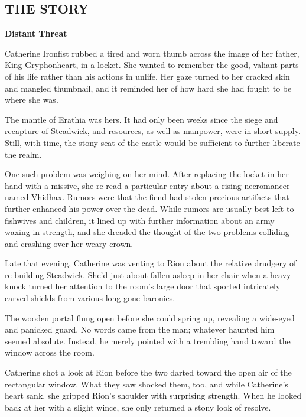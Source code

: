 \newpage

\begin{multicols*}{2}

\subsection*{\MakeUppercase{The story}}

\textbf{Distant Threat}

Catherine Ironfist rubbed a tired and worn thumb across the image of her father, King Gryphonheart, in a locket. She wanted to remember the good, valiant parts of his life rather than his actions in unlife. Her gaze turned to her cracked skin and mangled thumbnail, and it reminded her of how hard she had fought to be where she was. 

The mantle of Erathia was hers. It had only been weeks since the siege and recapture of Steadwick, and resources, as well as manpower, were in short supply. Still, with time, the stony seat of the castle would be sufficient to further liberate the realm.

One such problem was weighing on her mind. After replacing the locket in her hand with a missive, she re-read a particular entry about a rising necromancer named Vhidhax. Rumors were that the fiend had stolen precious artifacts that further enhanced his power over the dead. While rumors are usually best left to fishwives and children, it lined up with further information about an army waxing in strength, and she dreaded the thought of the two problems colliding and crashing over her weary crown.

Late that evening, Catherine was venting to Rion about the relative drudgery of re-building Steadwick. She'd just about fallen asleep in her chair when a heavy knock turned her attention to the room's large door that sported intricately carved shields from various long gone baronies. 

The wooden portal flung open before she could spring up, revealing a wide-eyed and panicked guard. No words came from the man; whatever haunted him seemed absolute. Instead, he merely pointed with a trembling hand toward the window across the room.

Catherine shot a look at Rion before the two darted toward the open air of the rectangular window. What they saw shocked them, too, and while Catherine's heart sank, she gripped Rion's shoulder with surprising strength. When he looked back at her with a slight wince, she only returned a stony look of resolve.


\end{multicols*}
